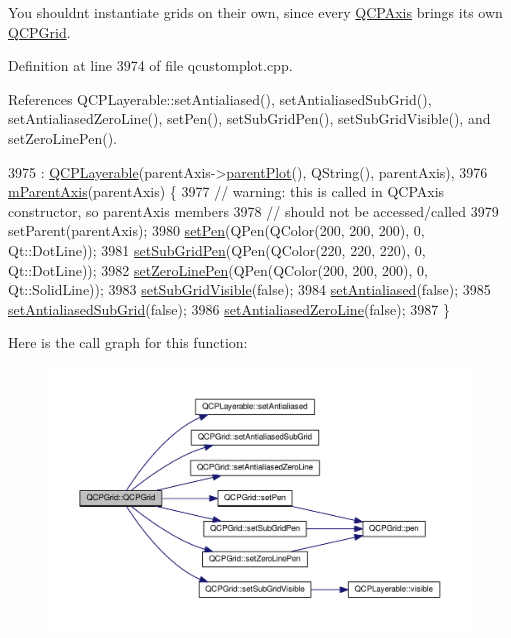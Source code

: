 You shouldn\textquotesingle{}t instantiate grids on their own, since every \hyperlink{class_q_c_p_axis}{Q\+C\+P\+Axis} brings its own \hyperlink{class_q_c_p_grid}{Q\+C\+P\+Grid}. 

Definition at line 3974 of file qcustomplot.\+cpp.



References Q\+C\+P\+Layerable\+::set\+Antialiased(), set\+Antialiased\+Sub\+Grid(), set\+Antialiased\+Zero\+Line(), set\+Pen(), set\+Sub\+Grid\+Pen(), set\+Sub\+Grid\+Visible(), and set\+Zero\+Line\+Pen().


\begin{DoxyCode}
3975     : \hyperlink{class_q_c_p_layerable_a74c0fa237f29bf0e49565013fc5d1ec0}{QCPLayerable}(parentAxis->\hyperlink{class_q_c_p_layerable_ab7e0e94461566093d36ffc0f5312b109}{parentPlot}(), QString(), parentAxis),
3976       \hyperlink{class_q_c_p_grid_a9a8a76731e6e737b65b929fd1995cc88}{mParentAxis}(parentAxis) \{
3977   \textcolor{comment}{// warning: this is called in QCPAxis constructor, so parentAxis members}
3978   \textcolor{comment}{// should not be accessed/called}
3979   setParent(parentAxis);
3980   \hyperlink{class_q_c_p_grid_aa05ab9816ffb440908171e45e833b593}{setPen}(QPen(QColor(200, 200, 200), 0, Qt::DotLine));
3981   \hyperlink{class_q_c_p_grid_a9edd3593f384d1f0b0202a39cef4453d}{setSubGridPen}(QPen(QColor(220, 220, 220), 0, Qt::DotLine));
3982   \hyperlink{class_q_c_p_grid_a209f40fdb252397b418b82d3494d8ea0}{setZeroLinePen}(QPen(QColor(200, 200, 200), 0, Qt::SolidLine));
3983   \hyperlink{class_q_c_p_grid_ad4ad6bf714ec45e08845456355a1b700}{setSubGridVisible}(\textcolor{keyword}{false});
3984   \hyperlink{class_q_c_p_layerable_a4fd43e89be4a553ead41652565ff0581}{setAntialiased}(\textcolor{keyword}{false});
3985   \hyperlink{class_q_c_p_grid_a5692310ba183721a413d60951407d114}{setAntialiasedSubGrid}(\textcolor{keyword}{false});
3986   \hyperlink{class_q_c_p_grid_a3cc6d54647393ee71afb6da56af07aa4}{setAntialiasedZeroLine}(\textcolor{keyword}{false});
3987 \}
\end{DoxyCode}


Here is the call graph for this function\+:\nopagebreak
\begin{figure}[H]
\begin{center}
\leavevmode
\includegraphics[width=350pt]{class_q_c_p_grid_acd1cdd2909625388a13048b698494a17_cgraph}
\end{center}
\end{figure}




